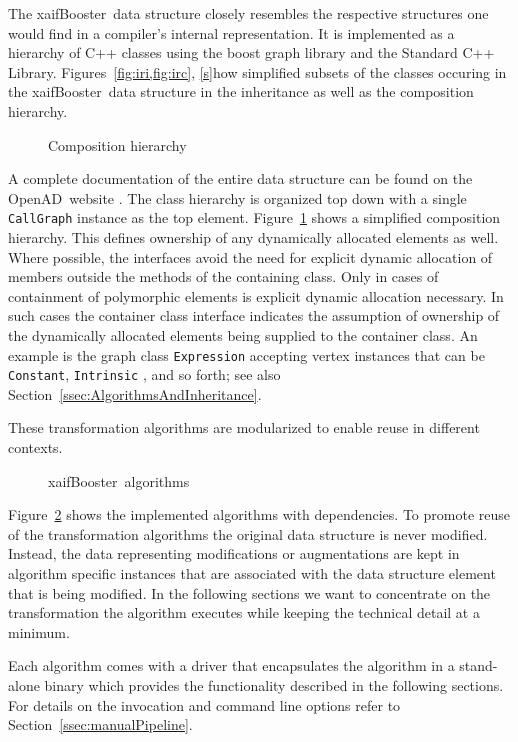 \documentclass[acmtocl,acmnow]{acmtrans2m}
\newcommand{\OpenAD}{OpenAD}
\newcommand{\xaifBooster}{xaifBooster}
\newcommand{\code}[1]{{\small\tt{#1}}}
\newcommand{\reffig}[1]{Figure~\ref{#1}}
\newcommand{\reffigs}[2]{Figures~\ref{#1}, \ref{#2}}
\newcommand{\refsec}[1]{Section~\ref{#1}}
\begin{document}
The \xaifBooster\ data structure  
closely resembles the respective structures one would find in a 
compiler's internal representation. 
It is implemented as a hierarchy of C++ classes 
using the boost graph library \cite{boostWeb}
and the Standard C++ Library\cite{libstdcWeb}.
\reffigs{fig:iri,fig:irc} show simplified subsets of the classes 
occuring in the \xaifBooster\ data structure in the inheritance 
as well as the composition hierarchy.  
\begin{figure}[htb]
\centering {}
\caption{Composition hierarchy} \label{fig:irc}
\end{figure}

A complete documentation of the entire data structure 
can be found on the \OpenAD\ website \cite{openadWeb}.
The class hierarchy is organized top down with 
a single \code{CallGraph} instance as the top element. 
\reffig{fig:irc} shows  a simplified composition hierarchy.
This defines ownership of any dynamically allocated elements as well. Where possible,
the interfaces avoid the need for explicit dynamic allocation of members outside the methods of the 
containing class. Only in cases of containment of polymorphic elements is explicit dynamic allocation 
necessary. In such cases the container class interface indicates the assumption of ownership of 
the dynamically allocated elements being supplied to the container class. An example is the 
graph class \code{Expression} accepting vertex instances that can be \code{Constant}, \code{Intrinsic} , and so forth; 
see also \refsec{ssec:AlgorithmsAndInheritance}.

These transformation algorithms are modularized to enable reuse in different 
contexts. 
\begin{figure}
\centering {}
\caption{\xaifBooster\ algorithms} \label{fig:allAlgs}
\end{figure}
\reffig{fig:allAlgs} shows the implemented algorithms with dependencies.
To promote reuse of the transformation algorithms the original data structure 
is never modified. Instead, the data representing modifications or augmentations
are kept in algorithm specific instances that are associated with the 
data structure element that is being modified. 
In the following sections we want to concentrate on the transformation 
the algorithm executes while keeping the technical detail at a minimum. 

Each algorithm comes with a driver that encapsulates the algorithm 
in a stand-alone binary which provides the functionality described in the following 
sections. For details on the invocation and command line options refer to 
\refsec{ssec:manualPipeline}.
 
\end{document}

